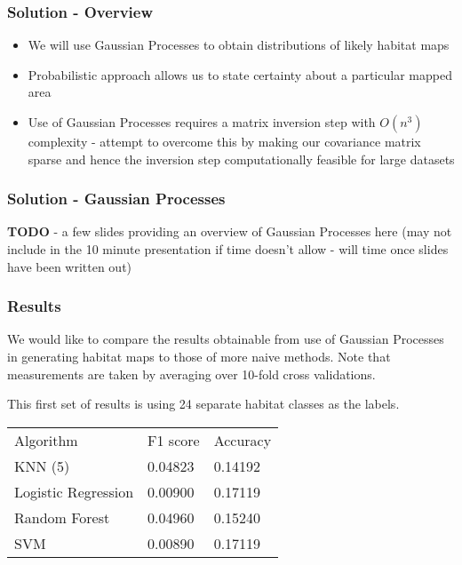 \documentclass{beamer}
\begin{document}
\begin{frame}
    \frametitle{Solution - Overview}
    \begin{itemize}
        \item We will use Gaussian Processes to obtain distributions of likely habitat maps
        \item Probabilistic approach allows us to state certainty about a particular mapped area
        \item Use of Gaussian Processes requires a matrix inversion step with $O(n^3)$ complexity - attempt to overcome this by making our covariance matrix sparse and hence the inversion step computationally feasible for large datasets
    \end{itemize}
\end{frame}

\begin{frame}
    \frametitle{Solution - Gaussian Processes}
    \textbf{TODO} - a few slides providing an overview of Gaussian Processes here (may not include in the 10 minute presentation if time doesn't allow - will time once slides have been written out)
\end{frame}

\begin{frame}
    \frametitle{Results}
    We would like to compare the results obtainable from use of Gaussian Processes in generating habitat maps to those of more naive methods. Note that measurements are taken by averaging over 10-fold cross validations.

    This first set of results is using 24 separate habitat classes as the labels.

    \begin{tabular}{l | l | l}
        Algorithm & F1 score & Accuracy \\
        KNN (5) & 0.04823 &  0.14192 \\
        Logistic Regression & 0.00900 & 0.17119 \\
        Random Forest & 0.04960 &  0.15240 \\
        SVM & 0.00890 & 0.17119 \\
    \end{tabular}

\end{frame}
\end{document}
